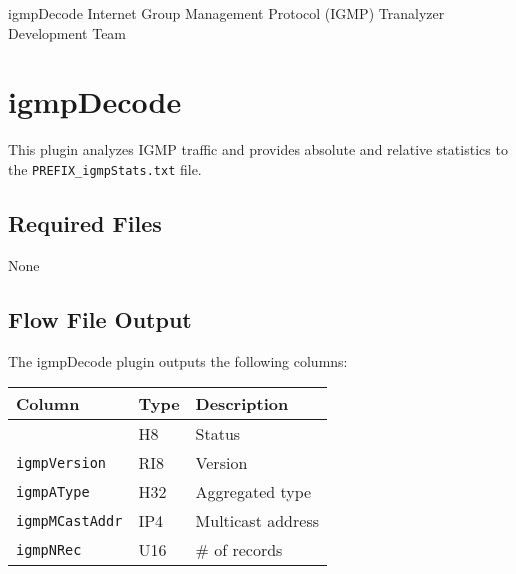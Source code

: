 \documentclass[documentation]{subfiles}
\begin{document}
\trantitle
    {igmpDecode}
    {Internet Group Management Protocol (IGMP)}
    {Tranalyzer Development Team}

\section{igmpDecode}\label{s:igmpDecode}
This plugin analyzes IGMP traffic and provides absolute and relative statistics to the {\tt PREFIX\_igmpStats.txt} file.

\subsection{Required Files}
None


\subsection{Flow File Output}
The igmpDecode plugin outputs the following columns:
\begin{longtable}{lll}
    \toprule
    {\bf Column} & {\bf Type} & {\bf Description} \\
    \midrule\endhead%
    {\tt\nameref{igmpStat}} & H8  & Status\\
    {\tt igmpVersion}       & RI8 & Version\\
    {\tt igmpAType}         & H32 & Aggregated type \\%
    {\tt igmpMCastAddr}     & IP4 & Multicast address\\
    {\tt igmpNRec}          & U16 & \# of records\\
    \bottomrule
\end{longtable}
\end{document}
